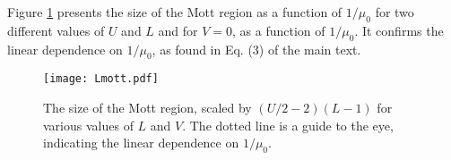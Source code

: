 \documentclass[aps,prl,showpacs,twocolumn,superscriptaddress]{revtex4-2}
\begin{document}
\author{K. Hallberg}

\author{Amnon Aharony}

\author{Ora Entin-Wohlman}


\date{\today}



\maketitle




 Figure \ref{Lmott} presents  the  size of the Mott region as a function of $1/\mu^{}_{0}$ for two different values of $U$ and $L$ and for $V=0$, as a function of $1/\mu^{}_0$. It confirms the linear dependence on $1/\mu^{}_{0}$, as found in Eq. (3) of the main text.




\begin{figure}[h]
\centering
 \texttt{[image: Lmott.pdf]}
 \caption{The size of the Mott region, scaled by $(U/2-2)(L-1)$ for  various values of  $L$ and $V$. The dotted  line is a guide to the eye, indicating the linear dependence on $1/\mu^{}_{0}$.}
 \label{Lmott}
\end{figure}


\end{document}
